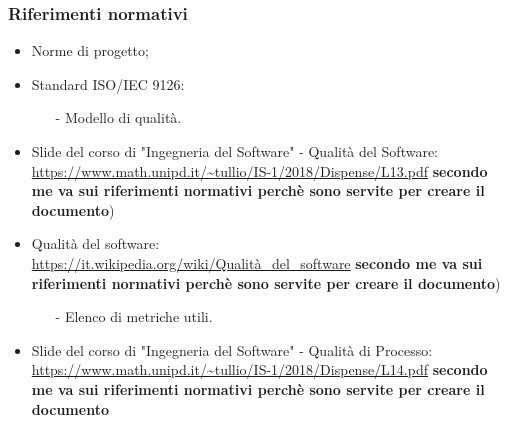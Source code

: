  \subsubsection{Riferimenti normativi}
 \begin{itemize}
 	\item Norme di progetto;
 	\item Standard ISO/IEC 9126:
 		\begin{itemize}
 			\item[-] Modello di qualità.
 		\end{itemize}
	\item Slide del corso di "Ingegneria del Software" - Qualità del Software: \\
		\url{https://www.math.unipd.it/~tullio/IS-1/2018/Dispense/L13.pdf} \textbf{secondo me va sui riferimenti normativi perchè sono servite per creare il documento})
	\item Qualità del software: \\
  			\url{https://it.wikipedia.org/wiki/Qualità_del_software} \textbf{secondo me va sui riferimenti normativi perchè sono servite per creare il documento})
  			\begin{itemize}
  				\item[-] Elenco di metriche utili.
  			\end{itemize} 
	\item  Slide del corso di "Ingegneria del Software" - Qualità di Processo: \\
 			\url {https://www.math.unipd.it/~tullio/IS-1/2018/Dispense/L14.pdf}  \textbf{secondo me va sui riferimenti normativi perchè sono servite per creare il documento}
 \end{itemize}
